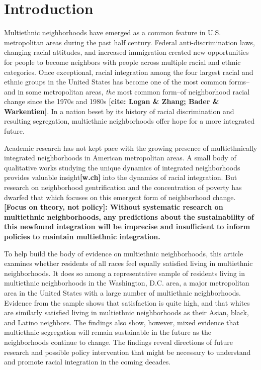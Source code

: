 \documentclass{baderart}
\begin{document}
\section{Introduction}\label{introduction}

Multiethnic neighborhoods have emerged as a common feature in U.S.
metropolitan areas during the past half century. Federal
anti-discrimination laws, changing racial attitudes, and increased
immigration created new opportunities for people to become neighbors
with people across multiple racial and ethnic categories. Once
exceptional, racial integration among the four largest racial and ethnic
groups in the United States has become one of the most common forms--and
in some metropolitan areas, \emph{the} most common form--of neighborhood
racial change since the 1970s and 1980s \textbf{{[}cite: Logan \& Zhang;
Bader \& Warkentien{]}}. In a nation beset by its history of racial
discrimination and resulting segregation, multiethnic neighborhoods
offer hope for a more integrated future.

Academic research has not kept pace with the growing presence of
multiethnically integrated neighborhoods in American metropolitan areas.
A small body of qualitative works studying the unique dynamics of
integrated neighborhoods provides valuable insight\textbf{{[}w.ch{]}}
into the dynamics of racial integration. But research on neighborhood
gentrification and the concentration of poverty has dwarfed that which
focuses on this emergent form of neighborhood change. \textbf{{[}Focus
on theory, not policy{]}: Without systematic research on multiethnic
neighborhoods, any predictions about the sustainability of this newfound
integration will be imprecise and insufficient to inform policies to
maintain multiethnic integration.}

To help build the body of evidence on multiethnic neighborhoods, this
article examines whether residents of all races feel equally satisfied
living in multiethnic neighborhoods. It does so among a representative
sample of residents living in multiethnic neighborhoods in the
Washington, D.C. area, a major metropolitan area in the United States
with a large number of multiethnic neighborhoods. Evidence from the
sample shows that satisfaction is quite high, and that whites are
similarly satisfied living in multiethnic neighborhoods as their Asian,
black, and Latino neighbors. The findings also show, however, mixed
evidence that multiethnic segregation will remain sustainable in the
future as the neighborhoods continue to change. The findings reveal
directions of future research and possible policy intervention that
might be necessary to understand and promote racial integration in the
coming decades.
\end{document}
